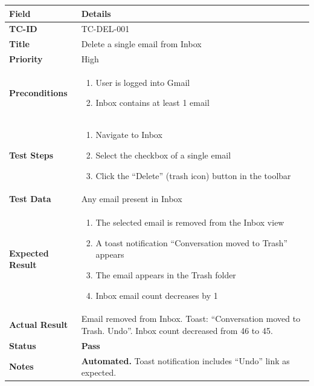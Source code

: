 \documentclass[12pt,a4paper]{article}
\begin{document}
\begin{longtable}{|L{3.5cm}|L{11.5cm}|}
\hline
{}\textbf{Field} & \textbf{Details} \\
\hline
\textbf{TC-ID}           & TC-DEL-001 \\
\hline
\textbf{Title}           & Delete a single email from Inbox \\
\hline
\textbf{Priority}        & High \\
\hline
\textbf{Preconditions}   & \begin{enumerate}[noitemsep,topsep=0pt]
                              \item User is logged into Gmail
                              \item Inbox contains at least 1 email
                            \end{enumerate} \\
\hline
\textbf{Test Steps}      & \begin{enumerate}[noitemsep,topsep=0pt]
                              \item Navigate to Inbox
                              \item Select the checkbox of a single email
                              \item Click the ``Delete'' (trash icon) button in the toolbar
                            \end{enumerate} \\
\hline
\textbf{Test Data}       & Any email present in Inbox \\
\hline
\textbf{Expected Result} & \begin{enumerate}[noitemsep,topsep=0pt]
                              \item The selected email is removed from the Inbox view
                              \item A toast notification ``Conversation moved to Trash'' appears
                              \item The email appears in the Trash folder
                              \item Inbox email count decreases by 1
                            \end{enumerate} \\
\hline
\textbf{Actual Result}   & Email removed from Inbox. Toast: ``Conversation moved to Trash. Undo''. Inbox count decreased from 46 to 45. \\
\hline
\textbf{Status}          & \textcolor{passgreen}{\textbf{Pass}} \\
\hline
\textbf{Notes}           & \textbf{Automated.} Toast notification includes ``Undo'' link as expected. \\
\hline
\end{longtable}
\end{document}
